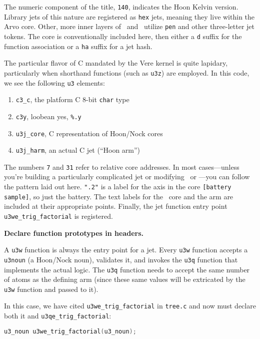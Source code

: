 \begin{example}
The numeric component of the title, \texttt{140}, indicates the Hoon Kelvin version.  Library jets of this nature are registered as \texttt{hex} jets, meaning they live within the Arvo core.  Other, more inner layers of \zuse~and \lull~utilize \texttt{pen} and other three-letter jet tokens.  The core is conventionally included here, then either a \texttt{d} suffix for the function association or a \texttt{ha} suffix for a jet hash.

The particular flavor of C mandated by the Vere kernel is quite lapidary, particularly when shorthand functions (such as \texttt{u3z}) are employed.  In this code, we see the following \texttt{u3} elements:

\begin{enumerate}
  \item  \texttt{c3\_c}, the platform C 8-bit \texttt{char} type
  \item  \texttt{c3y}, loobean yes, \texttt{\%.y}
  \item  \texttt{u3j\_core}, C representation of Hoon/Nock cores
  \item  \texttt{u3j\_harm}, an actual C jet (“Hoon arm”)
\end{enumerate}

The numbers \texttt{7} and \texttt{31} refer to relative core addresses.  In most cases—unless you're building a particularly complicated jet or modifying \zuse~or \lull—you can follow the pattern laid out here.  \texttt{".2"} is a label for the axis in the core \texttt{[battery sample]}, so just the battery.  The text labels for the \barcen~core and the arm are included at their appropriate points.  Finally, the jet function entry point \texttt{u3we\_trig\_factorial} is registered.

\textbf{Declare function prototypes in headers.}

A \texttt{u3w} function is always the entry point for a jet.  Every \texttt{u3w} function accepts a \texttt{u3noun} (a Hoon/Nock noun), validates it, and invokes the \texttt{u3q} function that implements the actual logic.  The \texttt{u3q} function needs to accept the same number of atoms as the defining arm (since these same values will be extricated by the \texttt{u3w} function and passed to it).

In this case, we have cited \texttt{u3we\_trig\_factorial} in \texttt{tree.c} and now must declare both it and \texttt{u3qe\_trig\_factorial}:

\begin{lstlisting}[language=C,
                   caption={Additions to \texttt{pkg/urbit/include/w.h}}]
u3_noun u3we_trig_factorial(u3_noun);
\end{lstlisting}


\end{example}
